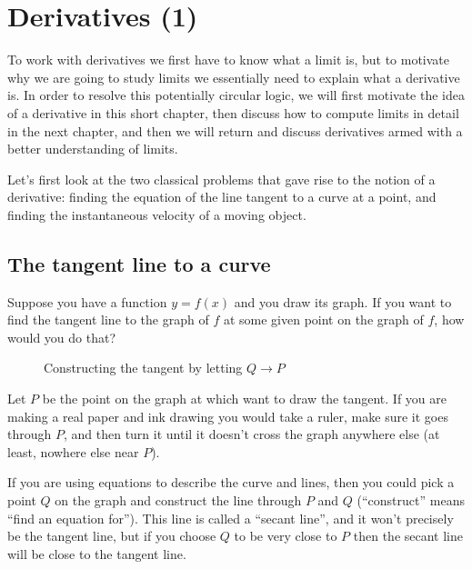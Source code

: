 
\chapter{Derivatives (1)}
\label{ch:derivs1}
To work with derivatives we first have to know what a limit is, but to motivate
why we are going to study limits we essentially need to explain what a
derivative is.  In order to resolve this potentially circular logic, we will
first motivate the idea of a derivative in this short chapter, then discuss how
to compute limits in detail in the next chapter, and then we will return and
discuss derivatives armed with a better understanding of limits.




Let's first look at the two classical problems that gave rise to the notion of a
derivative: finding the equation of the line tangent to a curve at a point, and
finding the instantaneous velocity of a moving object.

\section{The tangent line to a curve} 
\label{sec:tangent} Suppose you have a function $y=f(x)$ and you draw its graph.
If you want to find the tangent line to the graph of $f$ at some given point on the
graph of $f$, how would you do that?
\begin{figure}[h]\centering
  
  \caption{Constructing the tangent by letting $Q\to P$}
  \label{fig:constructTheTangent}
\end{figure}

Let $P$ be the point on the graph at which want to draw the tangent.  If you are
making a real paper and ink drawing you would take a ruler, make sure it goes
through $P$, and then turn it until it doesn't cross the graph anywhere else (at
least, nowhere else near $P$).

If you are using equations to describe the curve and lines, then you
could pick a point $Q$ on the graph and construct the line through $P$
and $Q$ (``construct'' means ``find an equation for'').  This line is
called a ``secant line'', and it won't precisely be the tangent line, but if you
choose $Q$ to be very close to $P$ then the secant line will be close to the
tangent line.

